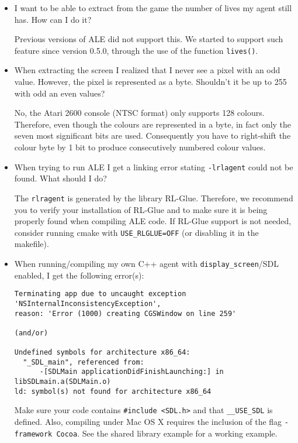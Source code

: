 \documentclass[12pt]{article}
\begin{document}
\begin{itemize}
\item I want to be able to extract from the game the number of lives my agent still has. How can I do it?

Previous versions of ALE did not support this. We started to support such feature since version 
0.5.0, through the use of the function \verb+lives()+.

\item When extracting the screen I realized that I never see a pixel with an odd value. However,
the pixel is represented as a byte. Shouldn't it be up to 255 with odd an even values?

No, the Atari 2600 console (NTSC format) only supports 128 colours. Therefore, even though the colours are represented 
in a byte, in fact only the seven most significant bits are used. Consequently you have
to right-shift the colour byte by 1 bit to produce consecutively numbered colour values.

\item When trying to run ALE I get a linking error stating \verb+-lrlagent+ could not be found.  
What should I do?

The \verb+rlragent+ is generated by the library RL-Glue. Therefore, we recommend you to verify your 
installation of RL-Glue and to make sure it is being properly found when compiling ALE code. If
RL-Glue support is not needed, consider running cmake with \verb+USE_RLGLUE=OFF+ (or disabling
it in the makefile).

\item When running/compiling my own C++ agent with \verb+display_screen+/SDL enabled, I get the following error(s):

\begin{verbatim}
Terminating app due to uncaught exception 'NSInternalInconsistencyException', 
reason: 'Error (1000) creating CGSWindow on line 259'

(and/or)

Undefined symbols for architecture x86_64:
  "_SDL_main", referenced from:
      -[SDLMain applicationDidFinishLaunching:] in libSDLmain.a(SDLMain.o)
ld: symbol(s) not found for architecture x86_64
\end{verbatim}

Make sure your code contains \verb+#include <SDL.h>+ and that \verb+__USE_SDL+ is defined. Also, compiling under Mac OS X requires the inclusion of the flag \verb+-framework Cocoa+. See the shared library example for a working example. 


\end{itemize}
\end{document}
